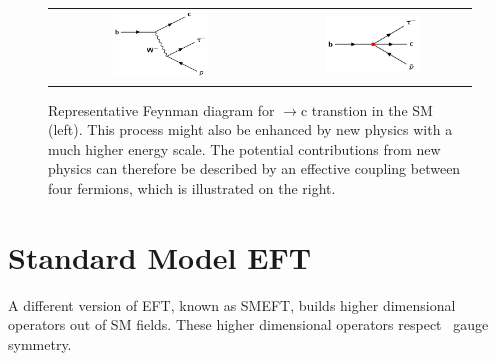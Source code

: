 \begin{figure}[tbh!]
 \begin{center}
 \begin{tabular}{cc}
 \includegraphics[width=0.45\textwidth]{figures/Part1/BSM/SMbtoc}&
 \includegraphics[width=0.5\textwidth]{figures/Part1/EFT/LEFT}
 \end{tabular}
 \caption{Representative Feynman diagram for $\rightarrow$c transtion in the \ac{SM} (left). This process might also be enhanced by new physics with a much higher energy scale. The potential contributions from new physics can therefore be described by an effective coupling between four fermions, which is illustrated on the right.}
 \label{fig:LEFT}
 \end{center}
\end{figure}

\section{Standard Model EFT}
\label{sec:SMEFT}

A different version of \ac{EFT}, known as \ac{SMEFT}, builds higher dimensional operators out of \ac{SM} fields. These higher dimensional operators respect \sm~gauge symmetry.